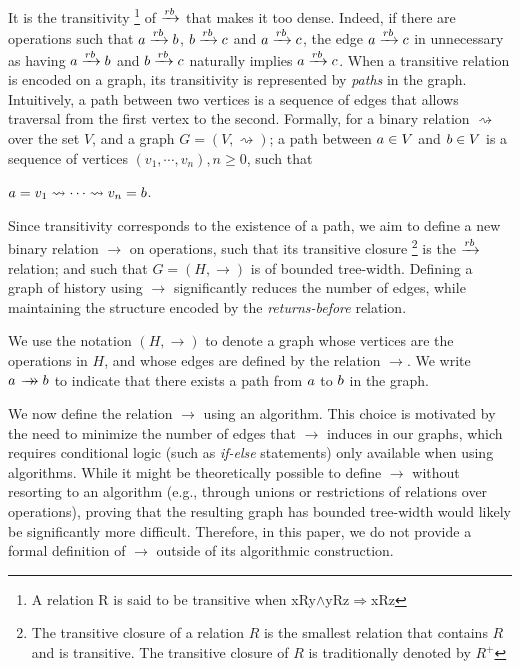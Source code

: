 \documentclass[12pt]{article}
\begin{document}
It is the transitivity
\footnote{A relation R is said to be transitive when xRy$\land$yRz$\Rightarrow$xRz}
 of $\xrightarrow{rb}$ that makes it too dense. Indeed, if there are operations such that \mbox{$a\xrightarrow{rb}b$}, \mbox{$b\xrightarrow{rb}c$} and \mbox{$a\xrightarrow{rb}c$}, the edge \mbox{$a\xrightarrow{rb}c$} in unnecessary as having \mbox{$a\xrightarrow{rb}b$} and \mbox{$b\xrightarrow{rb}c$} naturally implies \mbox{$a\xrightarrow{rb}c$}.
 When a transitive relation is encoded on a graph, its transitivity is represented by \textsl{paths} in the graph. Intuitively, a path between two vertices is a sequence of edges that allows traversal from the first vertex to the second. Formally, for a binary relation $\rightsquigarrow$ over the set $V$, and a graph  $G=(V,\rightsquigarrow)$; a path between $a\in V$ and $b\in V$ is a sequence of vertices $(v_1,\cdots,v_n),n\geq 0$, such that 

\begin{center}
$a= v_1\rightsquigarrow\cdots\rightsquigarrow v_n=b$.
\end{center}

Since transitivity corresponds to the existence of a path, we aim to define a new binary relation $\rightarrow$ on operations, such that its transitive closure
\footnote{The transitive closure of a relation $R$ is the smallest relation that contains $R$ and is transitive. The transitive closure of $R$ is traditionally denoted by $R^+$}
 is the $\xrightarrow{rb}$ relation; and such that $G=(H,\rightarrow)$ is of bounded tree-width. Defining a graph of history using $\rightarrow$ significantly reduces the number of edges, while maintaining the  structure encoded by the \textsl{returns-before} relation.

We use the notation $(H,\rightarrow)$ to denote a graph whose vertices are the operations in $H$, and whose edges are defined by the relation $\rightarrow$. We write $\opa\patharrow\opb$ to indicate that there exists a path from $a$ to $b$ in the graph.

\vspace{1em}

We now define the relation $\rightarrow$ using an algorithm. This choice is motivated by the need to minimize the number of edges that $\rightarrow$ induces in our graphs, which requires conditional logic (such as \emph{if-else} statements) only available when using algorithms. While it might be theoretically possible to define $\rightarrow$  without resorting to an algorithm (e.g., through unions or restrictions of relations over operations), proving that the resulting graph has bounded tree-width would likely be significantly more difficult. Therefore, in this paper, we do not provide a formal definition of $\rightarrow$ outside of its algorithmic construction.
\end{document}
